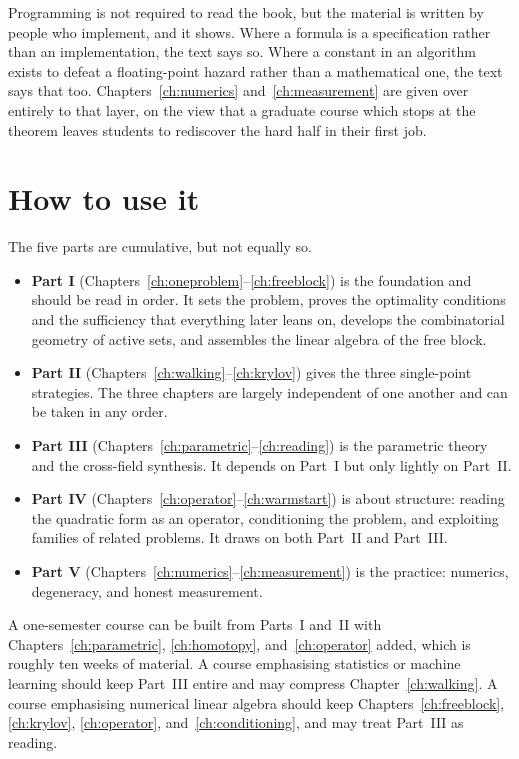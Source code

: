 Programming is not required to read the book, but the material is written by
people who implement, and it shows. Where a formula is a specification rather than
an implementation, the text says so. Where a constant in an algorithm exists to
defeat a floating-point hazard rather than a mathematical one, the text says that
too. Chapters~\ref{ch:numerics} and~\ref{ch:measurement} are given over entirely
to that layer, on the view that a graduate course which stops at the theorem
leaves students to rediscover the hard half in their first job.

\section*{How to use it}

The five parts are cumulative, but not equally so.

\begin{itemize}
\item \textbf{Part I} (Chapters~\ref{ch:oneproblem}--\ref{ch:freeblock}) is the
      foundation and should be read in order. It sets the problem, proves the
      optimality conditions and the sufficiency that everything later leans on,
      develops the combinatorial geometry of active sets, and assembles the
      linear algebra of the free block.
\item \textbf{Part II} (Chapters~\ref{ch:walking}--\ref{ch:krylov}) gives the
      three single-point strategies. The three chapters are largely independent
      of one another and can be taken in any order.
\item \textbf{Part III} (Chapters~\ref{ch:parametric}--\ref{ch:reading}) is the
      parametric theory and the cross-field synthesis. It depends on Part~I but
      only lightly on Part~II.
\item \textbf{Part IV} (Chapters~\ref{ch:operator}--\ref{ch:warmstart}) is about
      structure: reading the quadratic form as an operator, conditioning the
      problem, and exploiting families of related problems. It draws on both
      Part~II and Part~III.
\item \textbf{Part V} (Chapters~\ref{ch:numerics}--\ref{ch:measurement}) is the
      practice: numerics, degeneracy, and honest measurement.
\end{itemize}

A one-semester course can be built from Parts~I and~II with
Chapters~\ref{ch:parametric}, \ref{ch:homotopy}, and~\ref{ch:operator} added, which
is roughly ten weeks of material. A course emphasising statistics or machine
learning should keep Part~III entire and may compress Chapter~\ref{ch:walking}. A
course emphasising numerical linear algebra should keep
Chapters~\ref{ch:freeblock}, \ref{ch:krylov}, \ref{ch:operator},
and~\ref{ch:conditioning}, and may treat Part~III as reading.

